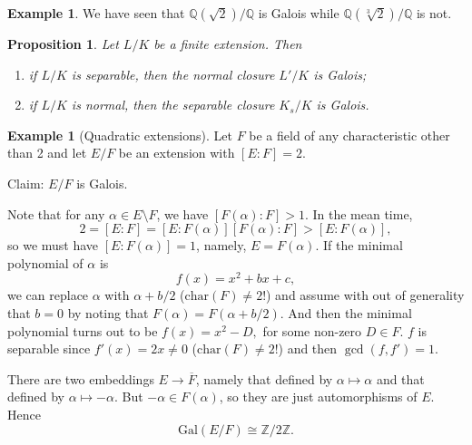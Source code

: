 \documentclass[12pt]{report}
\newtheorem{proposition}[theorem]{Proposition}
{\theoremstyle{remark}\newtheorem*{remark}{Remark}}
\theoremstyle{definition}
\newtheorem{example}[theorem]{Example}
\newcommand{\charr}{\text{char}}
\newcommand{\Gal}{\text{Gal}}
\newcommand{\ZZ}{\mathbb{Z}}
\newcommand{\QQ}{\mathbb{Q}}
\begin{document}
\begin{example}
	We have seen that $\QQ(\sqrt{2})/\QQ$ is Galois while $\QQ(\sqrt[3]{2})/\QQ$ is not.
\end{example}

\begin{proposition}
	Let $L/K$ be a finite extension. Then
	\begin{enumerate}
		\item if $L/K$ is separable, then the normal closure $L'/K$ is Galois;
		\item if $L/K$ is normal, then the separable closure $K_s/K$ is Galois.
	\end{enumerate}
\end{proposition}

\begin{example}[Quadratic extensions]
	Let $F$ be a field of any characteristic other than 2 and let $E/F$ be an extension with $[E:F]=2$.

	Claim: $E/F$ is Galois.

	Note that for any $\alpha\in E\setminus F$, we have $[F(\alpha):F] > 1$. In the mean time, $$2 = [E:F]=[E:F(\alpha)][F(\alpha):F] > [E:F(\alpha)],$$ so we must have $[E:F(\alpha)]=1$, namely, $E=F(\alpha)$. If the minimal polynomial of $\alpha$ is $$f(x)=x^2+bx+c,$$ we can replace $\alpha$ with $\alpha+b/2$ ($\charr(F)\not=2$!) and assume with out of generality that $b=0$ by noting that $F(\alpha)=F(\alpha+b/2)$. And then the minimal polynomial turns out to be $f(x)=x^2-D,$ for some non-zero $D\in F$. $f$ is separable since $f'(x)=2x\not=0$ ($\charr(F)\not=2$!) and then $\gcd(f,f')=1$.

	There are two embeddings $E\to \overline{F}$, namely that defined by $\alpha\mapsto\alpha$ and that defined by $\alpha\mapsto -\alpha$. But $-\alpha\in F(\alpha)$, so they are just automorphisms of $E$. Hence $$\Gal(E/F)\cong \ZZ/2\ZZ.$$
\end{example}
\end{document}
